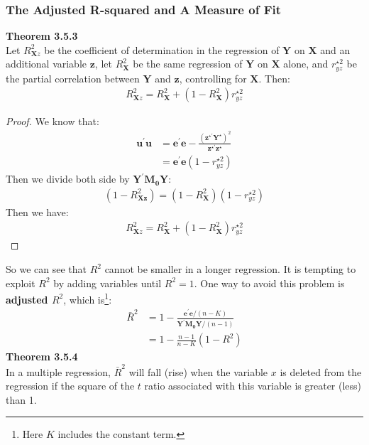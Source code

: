\documentclass{article}
\begin{document}
\subsubsection{The Adjusted R-squared and A Measure of Fit}
\textbf{Theorem 3.5.3}\\
Let $R^2_{\boldsymbol{X}z}$ be the coefficient of determination in the regression of $\boldsymbol{Y}$ on $\boldsymbol{X}$ and an additional variable $\boldsymbol{z}$, let $R^2_{\boldsymbol{X}}$ be the same regression of $\boldsymbol{Y}$ on $\boldsymbol{X}$ alone, and $r^{\star2}_{yz}$ be the partial correlation between $\boldsymbol{Y}$ and $\boldsymbol{z}$, controlling for $\boldsymbol{X}$. Then:
	\begin{align*}
		R^2_{\boldsymbol{X}z} = R^2_{\boldsymbol{X}} + (1 - R^2_{\boldsymbol{X}}) r^{\star2}_{yz}
	\end{align*}
	\begin{proof}
		We know that:
			\begin{align*}
				\boldsymbol{u}^\prime \boldsymbol{u} &= \boldsymbol{e}^\prime \boldsymbol{e} - \frac{(\boldsymbol{z}^{\star\prime} \boldsymbol{Y}^\star)^2}{\boldsymbol{z}^{\star\prime}\boldsymbol{z}^\star}\\
				&= \boldsymbol{e}^\prime \boldsymbol{e} (1 - r^{\star2}_{yz})
			\end{align*}
		Then we divide both side by $\boldsymbol{Y}^\prime \boldsymbol{M_0} \boldsymbol{Y}$:
			\begin{align*}
				(1 - R^2_{\boldsymbol{X z}}) = (1 - R^2_{\boldsymbol{X}}) (1 - r^{\star2}_{yz})
			\end{align*}
		Then we have:
			\begin{align*}
				R^2_{\boldsymbol{X}z} = R^2_{\boldsymbol{X}} + (1 - R^2_{\boldsymbol{X}}) r^{\star2}_{yz}
			\end{align*}
	\end{proof}
\noindent So we can see that $R^2$ cannot be smaller in a longer regression. It is tempting to exploit $R^2$ by adding variables until $R^2 = 1$. One way to avoid this problem is \textbf{adjusted $R^2$}, which is\footnote{Here $K$ includes the constant term.}:
	\begin{align*}
		\bar{R}^2 &= 1 - \frac{\boldsymbol{e}^\prime \boldsymbol{e} / (n - K)}{\boldsymbol{Y}^\prime \boldsymbol{M_0} \boldsymbol{Y} / (n - 1)}\\
		&= 1 - \frac{n - 1}{n - K} (1 - R^2) 
	\end{align*}
\textbf{Theorem 3.5.4}\\
In a multiple regression, $\bar{R}^2$ will fall (rise) when the variable $x$ is deleted from the regression if the square of the $t$ ratio associated with this variable is greater (less) than 1.   
\end{document}
